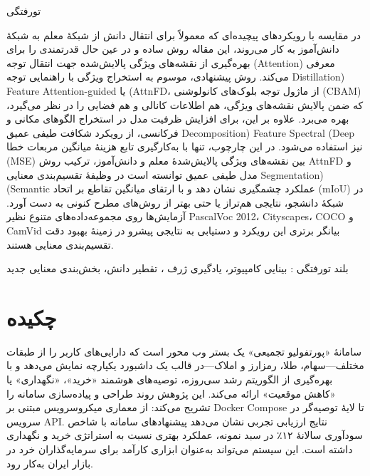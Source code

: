 
\vspace*{-60pt}
\enlargethispage{90pt}


\vspace{-1cm}

‌تورفتگی

در مقایسه با رویکردهای پیچیده‌ای که معمولاً برای انتقال دانش از شبکهٔ معلم به شبکهٔ دانش‌آموز به کار می‌روند، این مقاله روش ساده و در عین حال قدرتمندی را برای بهره‌گیری از نقشه‌های ویژگی پالایش‌شده جهت انتقال توجه (Attention) معرفی می‌کند. روش پیشنهادی، موسوم به استخراج ویژگی با راهنمایی توجه Distillation) Feature Attention-guided یا (AttnFD، از ماژول توجه بلوک‌های کانولوشنی (CBAM) که ضمن پالایش نقشه‌های ویژگی، هم اطلاعات کانالی و هم فضایی را در نظر می‌گیرد، بهره می‌برد. علاوه بر این، برای افزایش ظرفیت مدل در استخراج الگوهای مکانی و فرکانسی، از رویکرد شکافت طیفی عمیق Decomposition) Feature Spectral (Deep نیز استفاده می‌شود. در این چارچوب، تنها با به‌کارگیری تابع هزینهٔ میانگین مربعات خطا (MSE) بین نقشه‌های ویژگی پالایش‌شدهٔ معلم و دانش‌آموز، ترکیب روش AttnFD و مدل طیفی عمیق توانسته است در وظیفهٔ تقسیم‌بندی معنایی Segmentation) (Semantic عملکرد چشمگیری نشان دهد و با ارتقای میانگین تقاطع بر اتحاد (mIoU) در شبکهٔ دانشجو، نتایجی هم‌تراز یا حتی بهتر از روش‌های مطرح کنونی به دست آورد. آزمایش‌ها روی مجموعه‌داده‌های متنوع نظیر PascalVoc 2012، Cityscapes، COCO و CamVid بیانگر برتری این رویکرد و دستیابی به نتایجی پیشرو در زمینهٔ بهبود دقت تقسیم‌بندی معنایی هستند.

‌بلند
‌تورفتگی : 
بینایی کامپیوتر، یادگیری ژرف ، تقطیر دانش، بخش‌بندی معنایی 
‌جدید

\section*{چکیده}
سامانهٔ «پورتفولیو تجمیعی» یک بستر وب محور است که دارایی‌های کاربر را از طبقات مختلف—سهام، طلا، رمزارز و املاک—در قالب یک داشبورد یکپارچه نمایش می‌دهد و با بهره‌گیری از الگوریتم رشد سی‌روزه، توصیه‌های هوشمند «خرید»، «نگهداری» یا «کاهش موقعیت» ارائه می‌کند. این پژوهش روند طراحی و پیاده‌سازی سامانه را تشریح می‌کند: از معماری میکروسرویس مبتنی بر Docker Compose تا لایهٔ توصیه‌گر در سرویس API. نتایج ارزیابی‌ تجربی نشان می‌دهد پیشنهادهای سامانه با شاخص سودآوری سالانهٔ ۱۲٪ در سبد نمونه، عملکرد بهتری نسبت به استراتژی خرید و نگهداری داشته است. این سیستم می‌تواند به‌عنوان ابزاری کارآمد برای سرمایه‌گذاران خرد در بازار ایران به‌کار رود.
